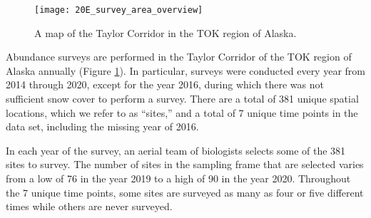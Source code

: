 \documentclass[]{interact}
\theoremstyle{plain}%
\theoremstyle{definition}
\theoremstyle{remark}
\begin{document}
\begin{figure}
\texttt{[image: 20E\_survey\_area\_overview]} \caption{\label{fig:tokplot} A map of the Taylor Corridor in the TOK region of Alaska.}\label{fig:tokplot}
\end{figure}

Abundance surveys are performed in the Taylor Corridor of the TOK region
of Alaska annually (Figure \ref{fig:tokplot}). In particular, surveys
were conducted every year from 2014 through 2020, except for the year
2016, during which there was not sufficient snow cover to perform a
survey. There are a total of 381 unique spatial locations, which we
refer to as ``sites,'' and a total of 7 unique time points in the data
set, including the missing year of 2016.

In each year of the survey, an aerial team of biologists selects some of
the 381 sites to survey. The number of sites in the sampling frame that
are selected varies from a low of 76 in the year 2019 to a high of 90 in
the year 2020. Throughout the 7 unique time points, some sites are
surveyed as many as four or five different times while others are never
surveyed.
\end{document}
